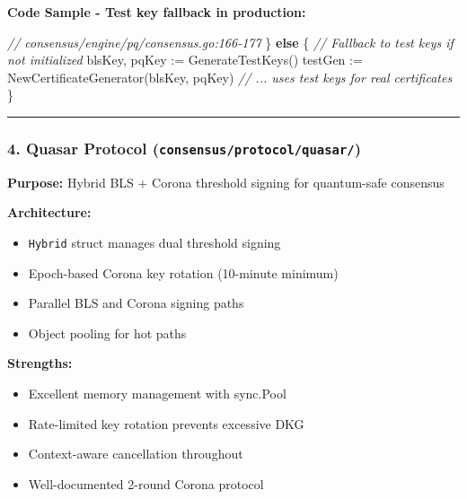 \documentclass[
]{article}
\newenvironment{Shaded}{}{}
\newcommand{\CommentTok}[1]{\textcolor[rgb]{0.38,0.63,0.69}{\textit{#1}}}
\newcommand{\ControlFlowTok}[1]{\textcolor[rgb]{0.00,0.44,0.13}{\textbf{#1}}}
\newcommand{\NormalTok}[1]{#1}
\newcommand{\OperatorTok}[1]{\textcolor[rgb]{0.40,0.40,0.40}{#1}}
\providecommand{\tightlist}{%
  \setlength{\itemsep}{0pt}\setlength{\parskip}{0pt}}
\begin{document}
\textbf{Code Sample - Test key fallback in production:}

\begin{Shaded}
\begin{Highlighting}[]
\CommentTok{// consensus/engine/pq/consensus.go:166{-}177}
\OperatorTok{\}} \ControlFlowTok{else} \OperatorTok{\{}
    \CommentTok{// Fallback to test keys if not initialized}
\NormalTok{    blsKey}\OperatorTok{,}\NormalTok{ pqKey }\OperatorTok{:=}\NormalTok{ GenerateTestKeys}\OperatorTok{()}
\NormalTok{    testGen }\OperatorTok{:=}\NormalTok{ NewCertificateGenerator}\OperatorTok{(}\NormalTok{blsKey}\OperatorTok{,}\NormalTok{ pqKey}\OperatorTok{)}
    \CommentTok{// ... uses test keys for real certificates}
\OperatorTok{\}}
\end{Highlighting}
\end{Shaded}

\begin{center}\rule{0.5\linewidth}{0.5pt}\end{center}

\subsubsection{\texorpdfstring{4. Quasar Protocol
(\texttt{consensus/protocol/quasar/})}{4. Quasar Protocol (consensus/protocol/quasar/)}}\label{4-quasar-protocol-consensusprotocolquasar}

\textbf{Purpose:} Hybrid BLS + Corona threshold signing for
quantum-safe consensus

\textbf{Architecture:}

\begin{itemize}
\tightlist
\item
  \texttt{Hybrid} struct manages dual threshold signing
\item
  Epoch-based Corona key rotation (10-minute minimum)
\item
  Parallel BLS and Corona signing paths
\item
  Object pooling for hot paths
\end{itemize}

\textbf{Strengths:}

\begin{itemize}
\tightlist
\item
  Excellent memory management with sync.Pool
\item
  Rate-limited key rotation prevents excessive DKG
\item
  Context-aware cancellation throughout
\item
  Well-documented 2-round Corona protocol
\end{itemize}
\end{document}
